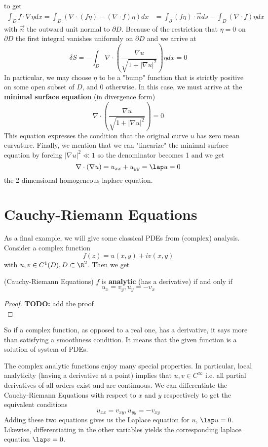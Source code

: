 \documentclass{bkcnotes}
\newcommand{\todo}[1]{{\bf TODO: } #1\\}
\begin{document}
to get
\begin{align*}
  \int_D f \cdot \nabla \eta dx = \int_D \left(\nabla \cdot (f \eta) -
    (\nabla \cdot f)\eta\right)dx &= \int_{\partial} (f\eta) \cdot
  \vec{n}ds - \int_D (\nabla \cdot f) \eta dx
\end{align*}
with $\vec{n}$ the outward unit normal to $\partial D$. Because of the
restriction that $\eta = 0$ on $\partial D$ the first integral
vanishes uniformly on $\partial D$ and we arrive at
\begin{equation}
  \label{eq:first-variation-final}
  \delta S = -\int_D
  \nabla \cdot \left(\frac{\nabla u}{\sqrt{1 + |\nabla u|^2}}\right)\eta dx = 0
\end{equation}
In particular, we may choose $\eta$ to be a "bump" function that is
strictly positive on some open subset of $D$, and 0 otherwise. In this
case, we must arrive at the \textbf{minimal surface equation} (in
divergence form)
\begin{equation}
  \label{eq:minimal-surface}
  \nabla \cdot \left(\frac{\nabla u}{\sqrt{1 + |\nabla u|^2}}\right) = 0
\end{equation}
This equation expresses the condition that the original curve $u$ has
zero mean curvature. Finally, we mention that we can "linearize" the
minimal surface equation by forcing $|\nabla u|^2 \ll 1$ so the
denominator becomes 1 and we get
\begin{equation}
  \label{eq:2d-lap}
  \nabla \cdot (\nabla u) = u_{xx} + u_{yy} = \lap u = 0
\end{equation}
the 2-dimensional homogeneous laplace equation.

\section{Cauchy-Riemann Equations}
As a final example, we will give some classical PDEs from (complex)
analysis. Consider a complex function
\[
f(z) = u(x,y) + iv(x,y)
\]
with $u,v \in C^1(D), D \subset \R^2$. Then we get
\begin{nthm}(Cauchy-Riemann Equations)
  $f$ is \textbf{analytic} (has a derivative) if and only if
  \[
  u_x = v_y, u_y = -v_x
  \]
\end{nthm}
\begin{proof}
  \todo{add the proof}
\end{proof}
So if a complex function, as opposed to a real one, has a derivative,
it says more than satisfying a smoothness condition. It means that the
given function is a solution of system of PDEs.

The complex analytic functions enjoy many special properties. In
particular, local analyticity (having a derivative at a point) implies
that $u,v \in C^{\infty}$ i.e. all partial derivatives of all orders
exist and are continuous. We can differentiate the Cauchy-Riemann
Equations with respect to $x$ and $y$ respectively to get the
equivalent conditions
\[
u_{xx} = v_{xy}, u_{yy} = -v_{xy}
\]
Adding these two equations gives us the Laplace equation for $u$,
$\lap u = 0$. Likewise, differentiating in the other variables yields
the corresponding laplace equation $\lap v = 0$.
\end{document}
